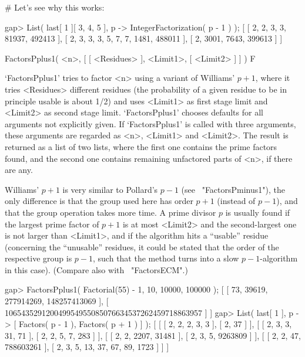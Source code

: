 # Let's see why this works:

gap> List( last[ 1 ]{[ 3, 4, 5 ]}, p -> IntegerFactorization( p - 1 ) );
[ [ 2, 2, 3, 3, 81937, 492413 ], [ 2, 3, 3, 3, 5, 7, 7, 1481, 488011 ], 
  [ 2, 3001, 7643, 399613 ] ]
\endexample


\>FactorsPplus1( <n>, [ [ <Residues> ], <Limit1>, [ <Limit2> ] ] ) F

`FactorsPplus1' tries to factor <n> using a variant of Williams' $p+1$, 
where it tries <Residues> different residues (the probability of a 
given residue to be in principle usable is about 1/2) and 
uses <Limit1> as first stage limit and <Limit2> as second stage
limit. `FactorsPplus1' chooses defaults for all arguments
not explicitly given.
If `FactorsPplus1' is called with three arguments, these arguments
are regarded as <n>, <Limit1> and <Limit2>.
The result is returned as a list of two lists, where the first one 
contains the prime factors found, and the second one contains
remaining unfactored parts of <n>, if there are any.

Williams' $p+1$ is very similar to Pollard's $p-1$ 
(see ~"FactorsPminus1"), the only difference is that the group 
used here has order $p+1$ (instead of $p-1$), and that the group
operation takes more time.
A prime divisor $p$ is usually found if the largest prime factor
of $p+1$ is at most <Limit2> and the second-largest one is not
larger than <Limit1>, and if the algorithm hits a ``usable''
residue (concerning the ``unusable'' residues, it could be stated
that the order of the respective group is $p-1$, such that
the method turns into a slow $p-1$-algorithm in this case).
(Compare also with ~"FactorsECM".)

\beginexample
gap> FactorsPplus1( Factorial(55) - 1, 10, 10000, 100000 );
[ [ 73, 39619, 277914269, 148257413069 ], 
  [ 106543529120049954955085076634537262459718863957 ] ]
gap> List( last[ 1 ], p -> [ Factors( p - 1 ), Factors( p + 1 ) ] );
[ [ [ 2, 2, 2, 3, 3 ], [ 2, 37 ] ], 
  [ [ 2, 3, 3, 31, 71 ], [ 2, 2, 5, 7, 283 ] ], 
  [ [ 2, 2, 2207, 31481 ], [ 2, 3, 5, 9263809 ] ], 
  [ [ 2, 2, 47, 788603261 ], [ 2, 3, 5, 13, 37, 67, 89, 1723 ] ] ]
\endexample



